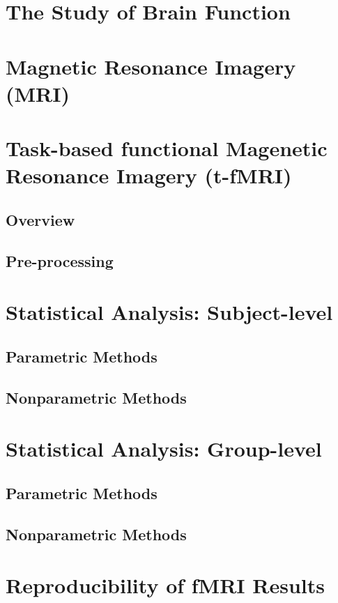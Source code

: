\section{The Study of Brain Function}

\section{Magnetic Resonance Imagery (MRI)}

\section{Task-based functional Magenetic Resonance Imagery (t-fMRI)}

\subsection{Overview}

\subsection{Pre-processing}

\section{Statistical Analysis: Subject-level}

\subsection{Parametric Methods}

\subsection{Nonparametric Methods}

\section{Statistical Analysis: Group-level}

\subsection{Parametric Methods}

\subsection{Nonparametric Methods}

\section{Reproducibility of fMRI Results}

